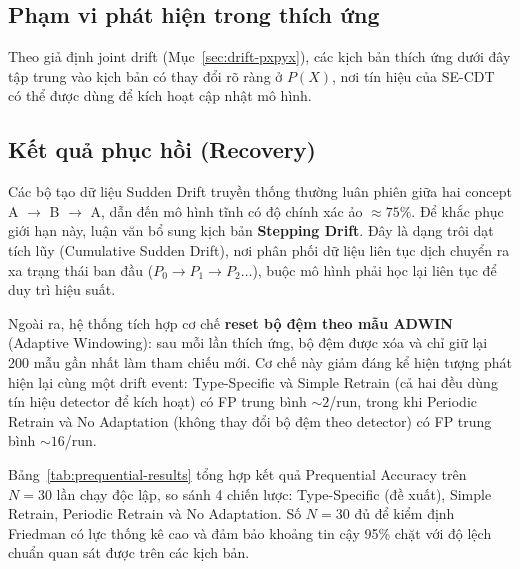 \subsection{Phạm vi phát hiện trong thích ứng}
Theo giả định joint drift (Mục~\ref{sec:drift-pxpyx}), các kịch bản thích ứng dưới đây tập trung vào kịch bản có thay đổi rõ ràng ở $P(X)$, nơi tín hiệu của SE-CDT có thể được dùng để kích hoạt cập nhật mô hình.

\subsection{Kết quả phục hồi (Recovery)}

Các bộ tạo dữ liệu Sudden Drift truyền thống thường luân phiên giữa hai concept A $\to$ B $\to$ A, dẫn đến mô hình tĩnh có độ chính xác ảo $\approx 75\%$. Để khắc phục giới hạn này, luận văn bổ sung kịch bản \textbf{Stepping Drift}. Đây là dạng trôi dạt tích lũy (Cumulative Sudden Drift), nơi phân phối dữ liệu liên tục dịch chuyển ra xa trạng thái ban đầu ($P_0 \to P_1 \to P_2 \dots$), buộc mô hình phải học lại liên tục để duy trì hiệu suất.

Ngoài ra, hệ thống tích hợp cơ chế \textbf{reset bộ đệm theo mẫu ADWIN} (Adaptive Windowing): sau mỗi lần thích ứng, bộ đệm được xóa và chỉ giữ lại 200 mẫu gần nhất làm tham chiếu mới. Cơ chế này giảm đáng kể hiện tượng phát hiện lại cùng một drift event: Type-Specific và Simple Retrain (cả hai đều dùng tín hiệu detector để kích hoạt) có FP trung bình $\sim 2$/run, trong khi Periodic Retrain và No Adaptation (không thay đổi bộ đệm theo detector) có FP trung bình $\sim 16$/run.

Bảng~\ref{tab:prequential-results} tổng hợp kết quả Prequential Accuracy trên $N = 30$ lần chạy độc lập, so sánh 4 chiến lược: Type-Specific (đề xuất), Simple Retrain, Periodic Retrain và No Adaptation. Số $N = 30$ đủ để kiểm định Friedman có lực thống kê cao và đảm bảo khoảng tin cậy 95\% chặt với độ lệch chuẩn quan sát được trên các kịch bản.

